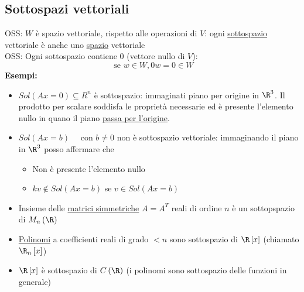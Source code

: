 \documentclass[12pt,a4paper,oneside]{article}
\begin{document}
\subsection{Sottospazi vettoriali}
OSS: $W$ è spazio vettoriale, rispetto alle operazioni di $V$: ogni \underline{sottospazio} vettoriale è anche uno \underline{spazio} vettoriale\\
OSS: Ogni sottospazio contiene $0$ (vettore nullo di $V$):
\[
	\text{ se } w \in  W , 0w=0 \in W
\]
\textbf{Esempi:}
\begin{itemize}
	\item $Sol\left( Ax= 0\right) \subseteq R^{n}$ è sottospazio: immaginati piano per origine in  $\R^{3}$. Il prodotto per scalare soddisfa le proprietà necessarie ed è presente l'elemento nullo in quano il piano \underline{passa per l'origine}.
	\item $Sol\left( Ax=b \right) \quad \text{ con } b \neq 0$ non è sottospazio vettoriale: immaginando il piano in $\R^{3}$ posso affermare che
	      \begin{itemize}
		      \item Non è presente l'elemento nullo
		      \item $kv \not\in Sol\left( Ax=b \right) $ se $v \in Sol\left( Ax=b \right) $
	      \end{itemize}
	\item Insieme delle \underline{matrici simmetriche} $A=A^{T}$ reali di ordine $n$ è un sottopspazio di $M_n\left( \R \right) $
	\item  \underline{Polinomi} a coefficienti reali di grado $ < n$ sono sottospazio di $\R \left[ x \right] $ (chiamato $ \R_n\left[ x \right] $)
	\item $\R\left[ x \right] $ è sottospazio di $C\left( \R \right) $ (i polinomi sono sottospazio delle funzioni in generale)
\end{itemize}
\end{document}
